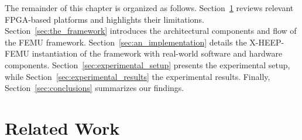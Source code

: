         The remainder of this chapter is organized as follows. Section~\ref{sec:related_work} reviews relevant FPGA-based platforms and highlights their limitations. Section~\ref{sec:the_framework} introduces the architectural components and flow of the \mbox{FEMU} framework. Section~\ref{sec:an_implementation} details the \mbox{X-HEEP-FEMU} instantiation of the framework with real-world software and hardware components. Section~\ref{sec:experimental_setup} presents the experimental setup, while Section~\ref{sec:experimental_results} the experimental results. Finally, Section~\ref{sec:conclusions} summarizes our findings.

    \section{Related Work}
    \label{sec:related_work}

